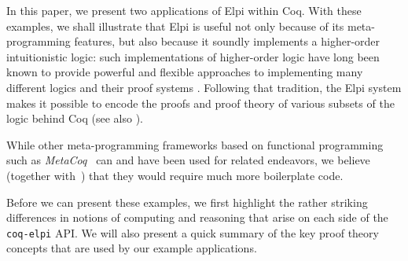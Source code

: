 In this paper, we present two applications of Elpi within Coq. With
these examples, we shall illustrate that Elpi is useful not only
because of its meta-programming features, but also because it soundly
implements a higher-order intuitionistic logic: such implementations
of higher-order logic have long been known to provide powerful and
flexible approaches to implementing many different logics and their
proof systems \cite{felty89phd,felty88cade,paulson89jar}.  Following
that tradition, the Elpi system makes it possible to encode the proofs
and proof theory of various subsets of the logic behind Coq (see also
\cite{felty93lics}). 

While other meta-programming frameworks based on functional
programming such as \emph{MetaCoq}~\cite{sozeau2020metacoq} can and
have been used for related endeavors, we believe (together
with~\cite{DunchevCT16}) that they would require much more
boilerplate code.

Before we can present these examples, we first highlight the rather
striking differences in notions of computing and reasoning that arise
on each side of the \texttt{coq-elpi} API.   We will also present a quick
summary of the key proof theory concepts that are used by our example
applications.


